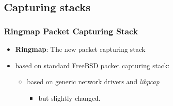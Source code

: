 \documentclass{beamer}
\begin{document}
\subsection*{Capturing stacks}
\begin{frame}
\frametitle{Ringmap Packet Capturing Stack}
\begin{itemize}
	\item \textbf{Ringmap}: The new packet capturing stack
	\item based on standard FreeBSD packet capturing stack: 		
		\begin{itemize}
			\item based on generic network drivers and \emph{libpcap}
			\begin{itemize}
				\item but slightly changed.\newline
			\end{itemize}
		\end{itemize}
\end{itemize}
\end{frame}
\end{document}
